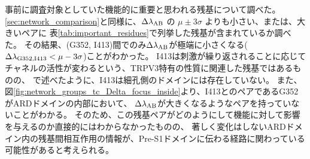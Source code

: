 事前に調査対象としていた機能的に重要と思われる残基について調べた。
\ref{sec:network_comparison}と同様に、$\Delta \lambda_{\rm{AB}}$ の $\mu \pm 3 \sigma$ よりも小さい、または、大きいペアに
表\ref{tab:important_residues}で列挙した残基が含まれているか調べた。
その結果、(G352, I413)間でのみ$\Delta \lambda_{\rm{AB}}$が極端に小さくなる($\Delta \lambda_{\rm{G352},\rm{I413}} < \mu - 3\sigma$)ことがわかった。
I413は刺激が繰り返されることに応じてチャネルの活性が変わるという、TRPV3特有の性質に関連した残基ではあるものの、
\label{sec:important_residues}で述べたように、I413は細孔側のドメインには存在していない。
また、図\ref{fig:network_groups_tc_Delta_focus_inside}より、I413とのペアであるG352がARDドメインの内部において、
$\Delta \lambda_{\rm{AB}}$が大きくなるようなペアを持っていないことがわかる。
そのため、この残基ペアがどのようにして機能に対して影響を与えるのか直接的にはわからなかったものの、
著しく変化はしないARDドメイン内の残基間相互作用の情報が、Pre-S1ドメインに伝わる経路に関わっている可能性があると考えられる。
